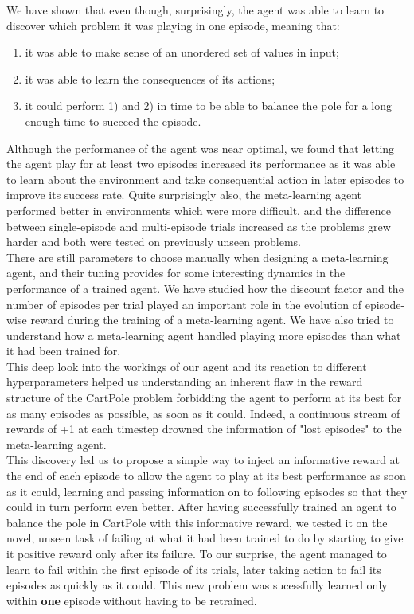 We have shown that even though, surprisingly, the agent was able to learn
to discover which problem it was playing in one episode, meaning that:
\begin{enumerate}
	\item it was able to make sense of an unordered set of values in input;
	\item it was able to learn the consequences of its actions;
	\item it could perform 1) and 2) in time to be able to balance the
		pole for a long enough time to succeed the episode.
\end{enumerate}
Although the performance of the agent was near optimal, we found that letting
the agent play for at least two episodes increased its performance as it
was able to learn about the environment and take consequential action in
later episodes to improve its success rate. Quite surprisingly also,
the meta-learning agent performed better in environments which were more
difficult, and the difference between single-episode and multi-episode trials
increased as the problems grew harder and both were tested on previously unseen
problems.\\

There are still parameters to choose manually when designing a meta-learning
agent, and their tuning provides for some interesting dynamics in the 
performance of a trained agent. We have studied how the discount factor
and the number of episodes per trial
played an important role in the evolution of episode-wise reward during the 
training of a meta-learning agent.
We have also tried to understand how a meta-learning agent handled playing
more episodes than what it had been trained for.\\

This deep look into the workings of our agent and its reaction to different
hyperparameters helped us understanding an inherent flaw in the reward structure
of the CartPole problem forbidding the agent to perform at its best for
as many episodes as possible, as soon as it could. Indeed, a continuous
stream of rewards of +1 at each timestep drowned the information of "lost
episodes" to the meta-learning agent.\\

This discovery led us to propose a simple way to inject an informative reward
at the end of each episode to allow the agent to play at its best performance
as soon as it could, learning and passing information on to following episodes
so that they could in turn perform even better. After having successfully
trained an agent to balance the pole in CartPole with this informative reward,
we tested it on the novel, unseen task of failing at what it had been trained
to do by starting to give it positive reward only after its failure. To
our surprise, the agent managed to learn to fail within the first episode
of its trials, later taking action to fail its episodes as quickly as it 
could. This new problem was sucessfully learned only within \textbf{one} episode
without having to be retrained.\\

